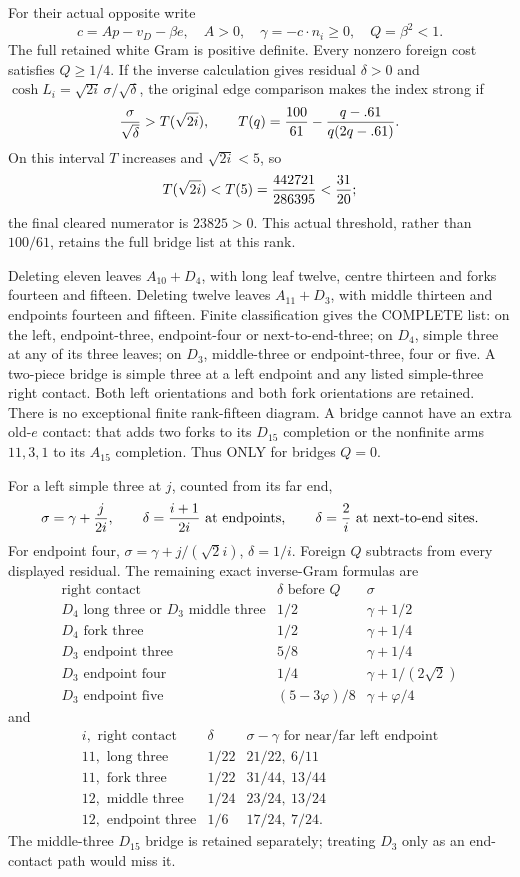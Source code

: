 \documentclass[11pt]{article}
\begin{document}
For their actual opposite write
\[
 c=Ap-v_D-\beta e,\quad A>0,\quad
 \gamma=-c\cdot n_i\ge0,\quad Q=\beta^2<1.
\]
The full retained white Gram is positive definite.
Every nonzero foreign cost satisfies \(Q\ge1/4\).
If the inverse calculation gives residual \(\delta>0\) and
\(\cosh L_i=\sqrt{2i}\,\sigma/\sqrt\delta\),
the original edge comparison makes the index strong if
\[
 {\sigma\over\sqrt\delta}>T(\sqrt{2i}),\qquad
 T(q)={100\over61}-{q-.61\over q(2q-.61)}.
\]
On this interval \(T\) increases and \(\sqrt{2i}<5\), so
\[
 T(\sqrt{2i})<T(5)={442721\over286395}<{31\over20};
\]
the final cleared numerator is \(23825>0\).
This actual threshold, rather than \(100/61\), retains
the full bridge list at this rank.

Deleting eleven leaves \(A_{10}+D_4\), with long leaf twelve,
centre thirteen and forks fourteen and fifteen.
Deleting twelve leaves \(A_{11}+D_3\), with middle thirteen
and endpoints fourteen and fifteen.
Finite classification gives the COMPLETE list:
on the left, endpoint-three, endpoint-four or next-to-end-three;
on \(D_4\), simple three at any of its three leaves;
on \(D_3\), middle-three or endpoint-three, four or five.
A two-piece bridge is simple three at a left endpoint and
any listed simple-three right contact.
Both left orientations and both fork orientations are retained.
There is no exceptional finite rank-fifteen diagram.
A bridge cannot have an extra old-\(e\) contact:
that adds two forks to its \(D_{15}\) completion or the
nonfinite arms \(11,3,1\) to its \(A_{15}\) completion.
Thus ONLY for bridges \(Q=0\).

For a left simple three at \(j\), counted from its far end,
\[
 \sigma=\gamma+{j\over2i},\qquad
 \delta={i+1\over2i}\text{ at endpoints},\qquad
 \delta={2\over i}\text{ at next-to-end sites}.
\]
For endpoint four,
\(\sigma=\gamma+j/(\sqrt2i)\), \(\delta=1/i\).
Foreign \(Q\) subtracts from every displayed residual.
The remaining exact inverse-Gram formulas are
\[
\begin{array}{c|c|c}
 \text{right contact}&\delta\text{ before }Q&\sigma\\ \hline
 D_4\text{ long three or }D_3\text{ middle three}
       &1/2&\gamma+1/2\\
 D_4\text{ fork three}&1/2&\gamma+1/4\\
 D_3\text{ endpoint three}&5/8&\gamma+1/4\\
 D_3\text{ endpoint four}&1/4&\gamma+1/(2\sqrt2)\\
 D_3\text{ endpoint five}&(5-3\varphi)/8&\gamma+\varphi/4
\end{array}
\]
and
\[
\begin{array}{c|c|c}
 i,\text{ right contact}&\delta&
       \sigma-\gamma\text{ for near/far left endpoint}\\ \hline
11,\text{ long three}&1/22&21/22,\ 6/11\\
11,\text{ fork three}&1/22&31/44,\ 13/44\\
12,\text{ middle three}&1/24&23/24,\ 13/24\\
12,\text{ endpoint three}&1/6&17/24,\ 7/24 .
\end{array}
\]
The middle-three \(D_{15}\) bridge is retained separately;
treating \(D_3\) only as an end-contact path would miss it.
\end{document}

